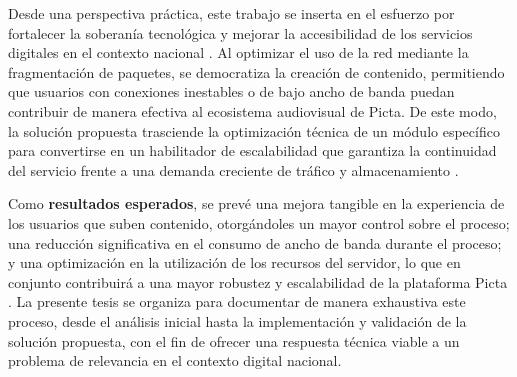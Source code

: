 Desde una perspectiva práctica, este trabajo se inserta en el esfuerzo por fortalecer la soberanía
tecnológica y mejorar la accesibilidad de los servicios digitales en el contexto nacional
\citep{Fuentes2025}. Al optimizar el uso de la red mediante la fragmentación de paquetes, se
democratiza la creación de contenido, permitiendo que usuarios con conexiones inestables o de bajo
ancho de banda puedan contribuir de manera efectiva al ecosistema audiovisual de Picta. De este
modo, la solución propuesta trasciende la optimización técnica de un módulo específico para
convertirse en un habilitador de escalabilidad que garantiza la continuidad del servicio frente a
una demanda creciente de tráfico y almacenamiento \citep{Avizienis2004}.

Como \textbf{resultados esperados}, se prevé una mejora tangible en la experiencia de los usuarios
que suben contenido, otorgándoles un mayor control sobre el proceso; una reducción significativa en
el consumo de ancho de banda durante el proceso; y una optimización en la utilización de los recursos
del servidor, lo que en conjunto contribuirá a una mayor robustez y escalabilidad de la plataforma
Picta \citep{Pressman2021}. La presente tesis se organiza para documentar de manera exhaustiva este
proceso, desde el análisis inicial hasta la implementación y validación de la solución propuesta,
con el fin de ofrecer una respuesta técnica viable a un problema de relevancia en el contexto digital
nacional.